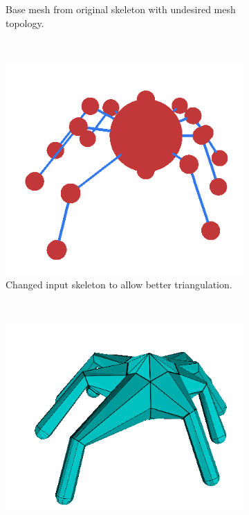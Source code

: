 \begin{figure}
\begin{subfigure}[b]{0.4\textwidth}
                \caption{Base mesh from original skeleton with undesired mesh topology.}
                \label{fig:pavuk_mesh_1}
        \end{subfigure}
        \\ %
        \begin{subfigure}[b]{0.4\textwidth}
        	\centering
                \includegraphics[width=\textwidth]{images/pavuk_kostra_upravena.png}
                \caption{Changed input skeleton to allow better triangulation.}
                \label{fig:pavuk_skl_2}
        \end{subfigure}
        ~ %
        \begin{subfigure}[b]{0.4\textwidth}
        	\centering
                \includegraphics[width=\textwidth]{images/pavuk_dobry.png}

\end{subfigure}
\end{figure}
